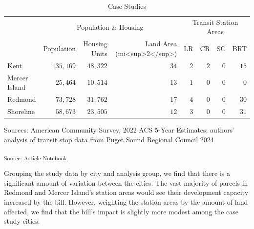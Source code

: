 \documentclass[
]{agujournal2019}
\begin{document}
\setlength{\LTpost}{0mm}

\begin{longtable}{l|rrrrrrr}

\caption{\label{tbl-results-case-studies-summary}Case Studies}

\tabularnewline

\toprule
\multicolumn{1}{l}{} & \multicolumn{3}{c}{Population \& Housing} & \multicolumn{4}{c}{Transit Station Areas} \\ 
\cmidrule(lr){2-4} \cmidrule(lr){5-8}
\multicolumn{1}{l}{} & Population & Housing Units & Land Area (mi<sup>2</sup>) & LR & CR & SC & BRT \\ 
\midrule
Kent & $135,169$ & $48,322$ & $34$ & $2$ & $2$ & $0$ & $15$ \\ 
Mercer Island & $25,464$ & $10,514$ & $13$ & $1$ & $0$ & $0$ & $0$ \\ 
Redmond & $73,728$ & $31,762$ & $17$ & $4$ & $0$ & $0$ & $30$ \\ 
Shoreline & $58,673$ & $23,505$ & $12$ & $3$ & $0$ & $0$ & $31$ \\ 
\bottomrule

\end{longtable}

\begin{minipage}{\linewidth}
Sources: American Community Survey, 2022 ACS 5-Year Estimates; authors' analysis of transit stop data from \protect\hyperlink{ref-pugetsoundregionalcouncil2024}{Puget Sound Regional Council 2024}\\
\end{minipage}

\textsubscript{Source:
\href{https://tiernanmartin.github.io/2024-transit-oriented-development-bill/index.qmd.html}{Article
Notebook}}

Grouping the study data by city and analysis group, we find that there
is a significant amount of variation between the cities. The vast
majority of parcels in Redmond and Mercer Island's station areas would
see their development capacity increased by the bill. However, weighting
the station areas by the amount of land affected, we find that the
bill's impact is slightly more modest among the case study cities.
\end{document}
